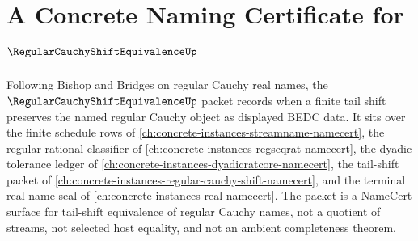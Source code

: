 \chapter{A Concrete Naming Certificate for $\RegularCauchyShiftEquivalenceUp$}
\label{ch:concrete-instances-regular-cauchy-shift-equivalence-namecert}

Following Bishop and Bridges on regular Cauchy real names, the $\RegularCauchyShiftEquivalenceUp$ packet records when a finite tail shift preserves the named regular Cauchy object as displayed BEDC data. It sits over the finite schedule rows of \autoref{ch:concrete-instances-streamname-namecert}, the regular rational classifier of \autoref{ch:concrete-instances-regseqrat-namecert}, the dyadic tolerance ledger of \autoref{ch:concrete-instances-dyadicratcore-namecert}, the tail-shift packet of \autoref{ch:concrete-instances-regular-cauchy-shift-namecert}, and the terminal real-name seal of \autoref{ch:concrete-instances-real-namecert}. The packet is a NameCert surface for tail-shift equivalence of regular Cauchy names, not a quotient of streams, not selected host equality, and not an ambient completeness theorem.

